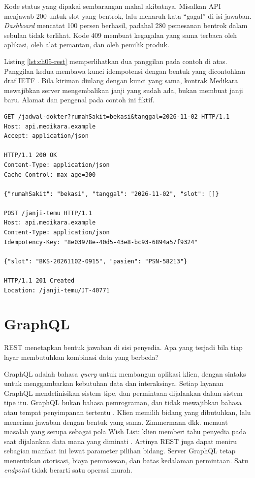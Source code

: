 Kode status yang dipakai sembarangan mahal akibatnya. Misalkan API menjawab 200 untuk slot yang bentrok, lalu menaruh
kata ``gagal'' di isi jawaban. \textit{Dashboard} mencatat 100 persen berhasil, padahal 280 pemesanan bentrok dalam sebulan
tidak terlihat. Kode 409 membuat kegagalan yang sama terbaca oleh aplikasi, oleh alat pemantau, dan oleh pemilik produk.

\begin{pendalaman}[title={Pendalaman Teknis (opsional): Membaca Permintaan dan Jawaban REST}]
Listing \ref{lst:ch05-rest} memperlihatkan dua panggilan pada contoh di atas. Panggilan kedua membawa kunci idempotensi
dengan bentuk yang dicontohkan draf IETF \cite{idempotency-key-draft}. Bila kiriman diulang dengan kunci yang sama, kontrak
Medikara mewajibkan server mengembalikan janji yang sudah ada, bukan membuat janji baru. Alamat dan pengenal pada contoh
ini fiktif.

\begin{lstlisting}[language=http, xleftmargin=8pt, captionpos=b, caption={Membaca jadwal dan membuat janji temu, tersedia di \berkas{sources/chapter05/contoh-rest-graphql.md}}, label={lst:ch05-rest}]
GET /jadwal-dokter?rumahSakit=bekasi&tanggal=2026-11-02 HTTP/1.1
Host: api.medikara.example
Accept: application/json

HTTP/1.1 200 OK
Content-Type: application/json
Cache-Control: max-age=300

{"rumahSakit": "bekasi", "tanggal": "2026-11-02", "slot": []}

POST /janji-temu HTTP/1.1
Host: api.medikara.example
Content-Type: application/json
Idempotency-Key: "8e03978e-40d5-43e8-bc93-6894a57f9324"

{"slot": "BKS-20261102-0915", "pasien": "PSN-58213"}

HTTP/1.1 201 Created
Location: /janji-temu/JT-40771
\end{lstlisting}
\end{pendalaman}

\section{GraphQL}

REST menetapkan bentuk jawaban di sisi penyedia. Apa yang terjadi bila tiap layar membutuhkan kombinasi data yang berbeda?

GraphQL adalah bahasa \textit{query} untuk membangun aplikasi klien, dengan sintaks untuk menggambarkan kebutuhan data dan
interaksinya. Setiap layanan GraphQL mendefinisikan sistem tipe, dan permintaan dijalankan dalam sistem tipe itu.
GraphQL bukan bahasa pemrograman, dan tidak mewajibkan bahasa atau tempat penyimpanan tertentu \cite{c05-graphql-spec}.
Klien memilih bidang yang dibutuhkan, lalu menerima jawaban dengan bentuk yang sama. Zimmermann dkk. memuat masalah yang
serupa sebagai pola Wish List: klien memberi tahu penyedia pada saat dijalankan data mana yang diminati
\cite{zimmermann2022patterns}. Artinya REST juga dapat meniru sebagian manfaat ini lewat parameter pilihan bidang. Server
GraphQL tetap menentukan otorisasi, biaya pemrosesan, dan batas kedalaman permintaan. Satu \textit{endpoint} tidak berarti
satu operasi murah.

